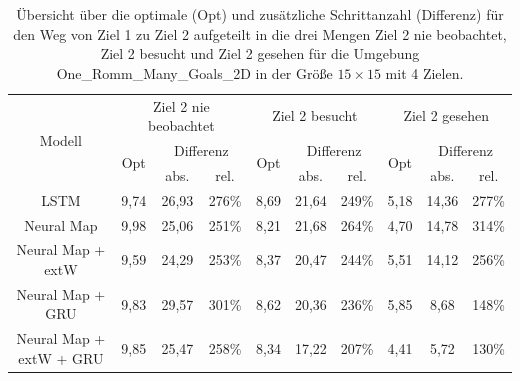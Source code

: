 \begin{table}
  \begin{tabular}{|c|c|c|c|c|c|c|c|c|c|}
    \hline
    \multirow{3}{*}{Modell} & \multicolumn{3}{|c|}{Ziel 2 nie beobachtet} & \multicolumn{3}{|c|}{Ziel 2 besucht} & \multicolumn{3}{|c|}{Ziel 2 gesehen} \\ \cline{2-10}
    & \multirow{2}{*}{Opt} & \multicolumn{2}{|c|}{Differenz} & \multirow{2}{*}{Opt} & \multicolumn{2}{|c|}{Differenz} & \multirow{2}{*}{Opt} & \multicolumn{2}{|c|}{Differenz} \\ \cline{3-4} \cline{6-7} \cline{9-10}
    & & abs. & rel. & & abs. & rel. & & abs. & rel. \\ \hline
    LSTM & 9,74 & 26,93 & 276\% & 8,69 & 21,64 & 249\% & 5,18 & 14,36 & 277\% \\ \hline
    Neural Map & 9,98 & 25,06 & 251\% & 8,21 & 21,68 & 264\% & 4,70 & 14,78 & 314\% \\ \hline
    Neural Map + extW & 9,59 & 24,29 & 253\% & 8,37 & 20,47 & 244\% & 5,51 & 14,12 & 256\% \\ \hline
    Neural Map + GRU & 9,83 & 29,57 & 301\% & 8,62 & 20,36 & 236\% & 5,85 & 8,68 & 148\% \\ \hline
    Neural Map + extW + GRU & 9,85 & 25,47 & 258\% & 8,34 & 17,22 & 207\% & 4,41 & 5,72 & 130\% \\ \hline
  \end{tabular}
  \caption{Übersicht über die optimale (Opt) und zusätzliche Schrittanzahl (Differenz) für den Weg von Ziel 1 zu Ziel 2 aufgeteilt in die drei Mengen \glqq Ziel 2 nie beobachtet\grqq{}, \glqq Ziel 2 besucht\grqq{} und \glqq Ziel 2 gesehen\grqq{} für die Umgebung \glqq One\_Romm\_Many\_Goals\_2D\grqq{} in der Größe $15 \times 15$ mit 4 Zielen.}
  \label{results15x15_2_to_3_per_M}
\end{table}

